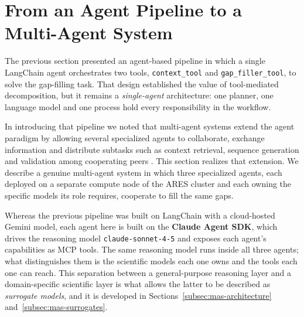 %
%
%

\section{From an Agent Pipeline to a Multi-Agent System}

The previous section presented an agent-based pipeline in which a single LangChain agent
orchestrates two tools, \texttt{context\_tool} and \texttt{gap\_filler\_tool}, to solve the
gap-filling task. That design established the value of tool-mediated decomposition, but it
remains a \textit{single-agent} architecture: one planner, one language model and one
process hold every responsibility in the workflow.

In introducing that pipeline we noted that multi-agent systems extend the agent paradigm by
allowing several specialized agents to collaborate, exchange information and distribute
subtasks such as context retrieval, sequence generation and validation among cooperating
peers \cite{li2024survey}. This section realizes that extension. We describe a genuine
multi-agent system in which three specialized agents, each deployed on a separate compute
node of the ARES cluster and each owning the specific models its role requires, cooperate
to fill the same gaps.

Whereas the previous pipeline was built on LangChain with a cloud-hosted Gemini model, each
agent here is built on the \textbf{Claude Agent SDK}, which drives the reasoning model
\texttt{claude-sonnet-4-5} and exposes each agent's capabilities as MCP tools. The same
reasoning model runs inside all three agents; what distinguishes them is the scientific
models each one owns and the tools each one can reach. This separation between a
general-purpose reasoning layer and a domain-specific scientific layer is what allows the
latter to be described as \textit{surrogate models}, and it is developed in
Sections~\ref{subsec:mas-architecture} and~\ref{subsec:mas-surrogates}.

